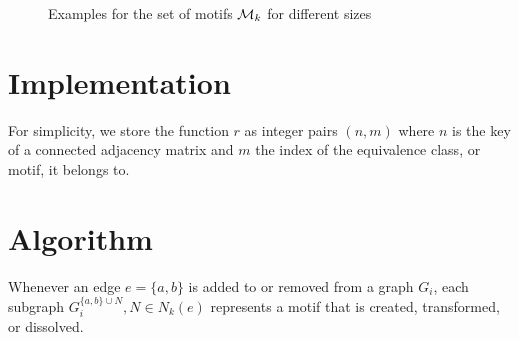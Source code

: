\documentclass{article}
\begin{document}
\begin{figure}[!htb]
	\hfill
	\caption{Examples for the set of motifs ${\cal M}_k$ for different sizes}
\end{figure}



\section{Implementation}

For simplicity, we store the function $r$ as integer pairs $(n,m)$ where $n$ is the key of a connected adjacency matrix and $m$ the index of the equivalence class, or motif, it belongs to.










\section{Algorithm}


\newcommand{\mcount}{{\cal F}}
\newcommand{\mcountof}[1]{{\cal F}(\motif{#1})}
\newcommand{\mcountofat}[2]{{\cal F}_{#2}(\motif{#1})}

\newcommand{\operation}{{\cal O}}
\newcommand{\signature}{{\cal S}}
\newcommand{\signatureofabcd}{\signature(a,b,c,d)}

Whenever an edge $e = \{a,b\}$ is added to or removed from a graph $G_i$, each subgraph $G_i^{\{a,b\} \cup N}, N \in N_k(e)$ represents a motif that is created, transformed, or dissolved.
\end{document}
